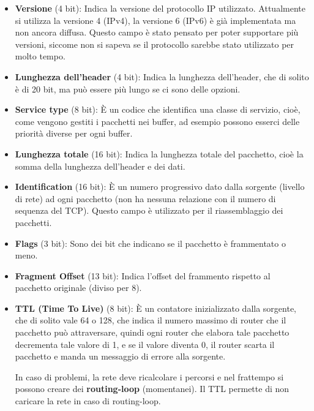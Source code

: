 \documentclass[a4paper]{article}
\begin{document}
\begin{itemize}
  \item \textbf{Versione} (4 bit): Indica la versione del protocollo IP utilizzato. Attualmente
    si utilizza la versione 4 (IPv4), la versione 6 (IPv6) è già implementata ma non
    ancora diffusa. Questo campo è stato pensato per poter supportare più versioni,
    siccome non si sapeva se il protocollo sarebbe stato utilizzato per molto tempo.

  \item \textbf{Lunghezza dell'header} (4 bit): Indica la lunghezza dell'header,
    che di solito è di 20 bit, ma può essere più lungo se ci sono delle opzioni.

  \item \textbf{Service type} (8 bit): È un codice che identifica una classe di servizio,
    cioè, come vengono gestiti i pacchetti nei buffer, ad esempio possono esserci
    delle priorità diverse per ogni buffer.

  \item \textbf{Lunghezza totale} (16 bit): Indica la lunghezza totale del pacchetto,
    cioè la somma della lunghezza dell'header e dei dati.

  \item \textbf{Identification} (16 bit): È un numero progressivo dato dalla sorgente
    (livello di rete) ad ogni pacchetto (non ha nessuna relazione con il numero di
    sequenza del TCP).
    Questo campo è utilizzato per il riassemblaggio dei pacchetti.

  \item \textbf{Flags} (3 bit): Sono dei bit che indicano se il pacchetto è frammentato
    o meno.

  \item \textbf{Fragment Offset} (13 bit): Indica l'offset del frammento rispetto al
    pacchetto originale (diviso per 8).

  \item \textbf{TTL (Time To Live)} (8 bit): È un contatore inizializzato dalla sorgente,
    che di solito vale 64 o 128, che indica il numero massimo di router che
    il pacchetto può attraversare, quindi ogni router che elabora tale pacchetto decrementa
    tale valore di 1, e se il valore diventa 0, il router scarta il pacchetto e manda un
    messaggio di errore alla sorgente.

    \vspace{1em}
    \noindent
    In caso di problemi, la rete deve ricalcolare i percorsi e nel frattempo si possono
    creare dei \textbf{routing-loop} (momentanei). Il TTL permette di non caricare la rete
    in caso di routing-loop.


\end{itemize}
\end{document}
